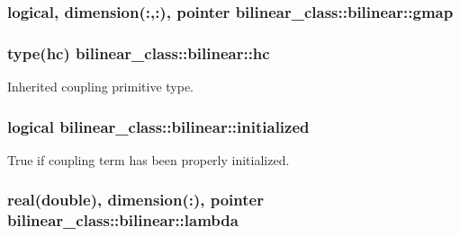 \hypertarget{structbilinear__class_1_1bilinear_aeb06e78f97c5cdac0c83422ec087e2e0}{
\subsubsection[{gmap}]{\setlength{\rightskip}{0pt plus 5cm}logical, dimension(\-:,\-:), pointer bilinear\-\_\-class\-::bilinear\-::gmap\hspace{0.3cm}{\ttfamily [private]}}}\label{structbilinear__class_1_1bilinear_aeb06e78f97c5cdac0c83422ec087e2e0}
\hypertarget{structbilinear__class_1_1bilinear_aeb9f98e320b690f4bfef83caf407dfaa}{
\subsubsection[{hc}]{\setlength{\rightskip}{0pt plus 5cm}type(hc) bilinear\-\_\-class\-::bilinear\-::hc\hspace{0.3cm}{\ttfamily [private]}}}\label{structbilinear__class_1_1bilinear_aeb9f98e320b690f4bfef83caf407dfaa}


Inherited coupling primitive type. 

\hypertarget{structbilinear__class_1_1bilinear_a97bca767cbc1ecae9489db5950da06bc}{
\subsubsection[{initialized}]{\setlength{\rightskip}{0pt plus 5cm}logical bilinear\-\_\-class\-::bilinear\-::initialized\hspace{0.3cm}{\ttfamily [private]}}}\label{structbilinear__class_1_1bilinear_a97bca767cbc1ecae9489db5950da06bc}


True if coupling term has been properly initialized. 

\hypertarget{structbilinear__class_1_1bilinear_aabd615d49d52220aac52707b2e2b1aa6}{
\subsubsection[{lambda}]{\setlength{\rightskip}{0pt plus 5cm}real(double), dimension(\-:), pointer bilinear\-\_\-class\-::bilinear\-::lambda\hspace{0.3cm}{\ttfamily [private]}}}\label{structbilinear__class_1_1bilinear_aabd615d49d52220aac52707b2e2b1aa6}


